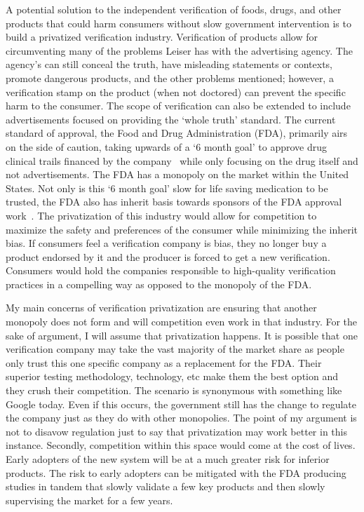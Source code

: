 \documentclass[12pt]{article}
\begin{document}
A potential solution to the independent verification of foods, drugs, and other
products that could harm consumers without slow government intervention is to
build a privatized verification industry. Verification of products allow for
circumventing many of the problems Leiser has with the advertising agency. The
agency's can still conceal the truth, have misleading statements or contexts,
promote dangerous products, and the other problems mentioned; however, a
verification stamp on the product (when not doctored) can prevent the specific
harm to the consumer. The scope of verification can also be extended to include
advertisements focused on providing the `whole truth' standard. The current
standard of approval, the Food and Drug Administration (FDA), primarily airs on
the side of caution, taking upwards of a `6 month goal' to approve drug clinical
trails financed by the company~\cite{fda} while only focusing on the drug
itself and not advertisements. The FDA has a monopoly on the market within the
United States. Not only is this `6 month goal' slow for life saving medication
to be trusted, the FDA also has inherit basis towards sponsors of the FDA
approval work~\cite{bias}. The privatization of this industry would allow for
competition to maximize the safety and preferences of the consumer while
minimizing the inherit bias. If consumers feel a verification company is bias,
they no longer buy a product endorsed by it and the producer is forced to get a
new verification. Consumers would hold the companies responsible to high-quality
verification practices in a compelling way as opposed to the monopoly of the
FDA.

My main concerns of verification privatization are ensuring that another
monopoly does not form and will competition even work in that industry. For the
sake of argument, I will assume that privatization happens. It is possible that
one verification company may take the vast majority of the market share as
people only trust this one specific company as a replacement for the FDA. Their
superior testing methodology, technology, etc make them the best option and they
crush their competition. The scenario is synonymous with something like Google
today. Even if this occurs, the government still has the change to regulate the
company just as they do with other monopolies. The point of my argument is not
to disavow regulation just to say that privatization may work better in this
instance. Secondly, competition within this space would come at the cost of
lives. Early adopters of the new system will be at a much greater risk for
inferior products. The risk to early adopters can be mitigated with the FDA
producing studies in tandem that slowly validate a few key products and then
slowly supervising the market for a few years.



\end{document}
